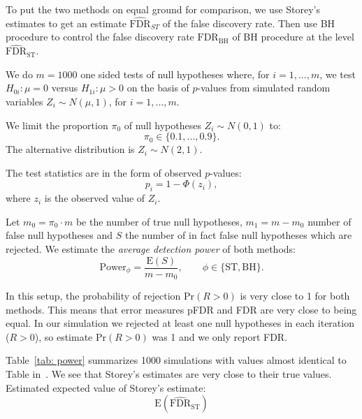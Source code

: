 \documentclass[10pt]{article}
\begin{document}
To put the two methods on equal ground for comparison, we use Storey's estimates to get an estimate $\widehat{\text{FDR}}_{ST}$ of the false discovery rate. Then use BH procedure to control the false discovery rate $\text{FDR}_{\text{BH}}$ of BH procedure at the level $\widehat{\text{FDR}}_{\text{ST}}$.

We do $m = 1000$ one sided tests of null hypotheses where, for $i = 1, ..., m$, we test $H_{0i}: \mu = 0$ versus $H_{1i}: \mu > 0$ on the basis of $p$-values from simulated random variables $Z_{i} \sim N(\mu, 1)$, for $i = 1,...,m$. 

We limit the proportion $\pi_{0}$ of null hypotheses $Z_{i} \sim N(0, 1)$ to:
\begin{equation}
\pi_{0} \in \lbrace 0.1, ..., 0.9 \rbrace.
\end{equation}
The alternative distribution is $Z_{i} \sim N(2, 1)$.

The test statistics are in the form of observed $p$-values:
\begin{equation}
	p_{i} = 1 - \Phi(z_{i}), %
\end{equation}
where $z_{i}$ is the observed value of $Z_{i}$. 

Let $m_{0} = \pi_{0} \cdot m$ be the number of true null hypotheses, $m_{1} = m - m_{0}$ number of false null hypotheses and $S$ the number of in fact false null hypotheses which are rejected. We estimate the {\it average detection power} of both methods:
\begin{equation}
\text{Power}_{\phi} = \frac{\text{E}(S)}{m - m_{0}}, \qquad \phi \in \lbrace \text{ST}, \text{BH} \rbrace.
\end{equation}

In this setup, the probability of rejection $\text{Pr}(R > 0)$ is very close to 1 for both methods. This means that error measures pFDR and FDR are very close to being equal. In our simulation we rejected at least one null hypotheses in each iteration ($R > 0$), so estimate $\text{Pr}(R > 0)$ was 1 and we only report FDR.

Table~\ref{tab: power} summarizes 1000 simulations with values almost identical to Table in~\cite{Storey}. We see that Storey's estimates are very close to their true values. Estimated expected value of Storey's estimate: 
\begin{equation}
	\text{E}\left(\widehat{\text{FDR}}_{\text{ST}}\right)
\end{equation} 
\end{document}
